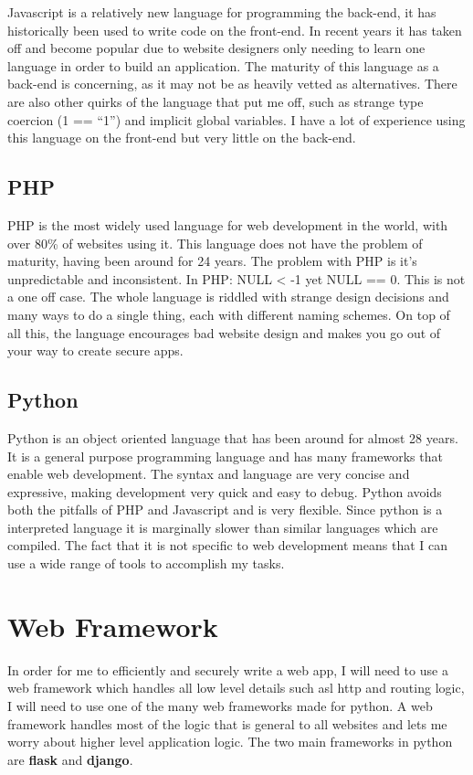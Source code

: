 \documentclass[a4paper,oneside,12pt]{report}
\begin{document}
	Javascript is a relatively new language for programming the back-end, it has historically been used to write code on the front-end. In recent years it has taken off and become popular due to website designers only needing to learn one language in order to build an application. The maturity of this language as a back-end is concerning, as it may not be as heavily vetted as alternatives. There are also other quirks of the language that put me off, such as strange type coercion (1 == “1”) and implicit global variables. I have a lot of experience using this language on the front-end but very little on the back-end.

	\subsection{PHP}
	PHP is the most widely used language for web development in the world, with over 80\% of websites using it. This language does not have the problem of maturity, having been around for 24 years. The problem with PHP is it’s unpredictable and inconsistent. In PHP: NULL < -1 yet NULL == 0. This is not a one off case. The whole language is riddled with strange design decisions and many ways to do a single thing, each with different naming schemes. On top of all this, the language encourages bad website design and makes you go out of your way to create secure apps.

	\subsection{Python}
	Python is an object oriented language that has been around for almost 28 years. It is a general purpose programming language and has many frameworks that enable web development. The syntax and language are very concise and expressive, making development very quick and easy to debug. Python avoids both the pitfalls of PHP and Javascript and is very flexible. Since python is a interpreted language it is marginally slower than similar languages which are compiled. The fact that it is not specific to web development means that I can use a wide range of tools to accomplish my tasks.

	\section{Web Framework}
	In order for me to efficiently and securely write a web app, I will need to use a web framework which handles all low level details such asl http and routing logic, I will need to use one of the many web frameworks made for python. A web framework handles most of the logic that is general to all websites and lets me worry about higher level application logic. The two main frameworks in python are \textbf{flask} and \textbf{django}.
\end{document}
